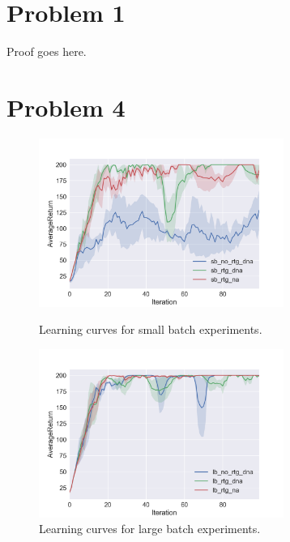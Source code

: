 \documentclass[12pt]{article}
\begin{document}
\pagebreak

\section{Problem 1}
Proof goes here.

\section{Problem 4}

\begin{figure}[!h]
\centering
\begin{minipage}[t]{0.48\textwidth}
\centering
\includegraphics[width=8cm]{Figure_1.png}
\caption{Learning curves for small batch experiments.}
\end{minipage}
\begin{minipage}[t]{0.48\textwidth}
\centering
\includegraphics[width=8cm]{Figure_2.png}
\caption{Learning curves for large batch experiments.}
\end{minipage}
\end{figure}
\end{document}

